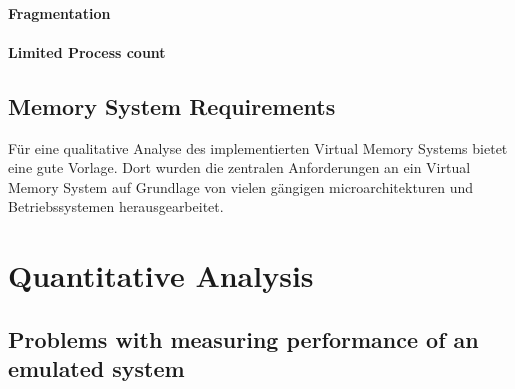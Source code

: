 

\paragraph*{Fragmentation}
\paragraph*{Limited Process count}

\subsection{Memory System Requirements} %
Für eine qualitative Analyse des implementierten Virtual Memory Systems bietet \cite{jacobSoftwaremanagedAddressTranslation1997}
eine gute Vorlage. Dort wurden die zentralen Anforderungen an ein Virtual Memory System auf Grundlage
von vielen gängigen microarchitekturen und Betriebssystemen herausgearbeitet.




%
\section{Quantitative Analysis}
\subsection{Problems with measuring performance of an emulated system}

